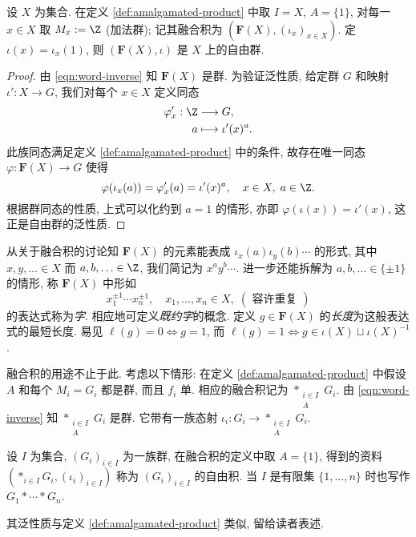 \begin{proposition}
	设 $X$ 为集合. 在定义 \ref{def:amalgamated-product} 中取 $I = X$, $A = \{1\}$, 对每一 $x \in X$ 取 $M_x := \Z$ (加法群); 记其融合积为 $(\mathbf{F}(X), (\iota_x)_{x \in X})$. 定 $\iota(x) = \iota_x(1)$, 则 $(\mathbf{F}(X), \iota)$ 是 $X$ 上的自由群.
\end{proposition}
\begin{proof}
	由 \eqref{eqn:word-inverse} 知 $\mathbf{F}(X)$ 是群. 为验证泛性质, 给定群 $G$ 和映射 $\iota': X \to G$, 我们对每个 $x \in X$ 定义同态
	\begin{align*}
		\varphi'_x: \Z & \longrightarrow G, \\
		a & \longmapsto \iota'(x)^a.
	\end{align*}
	此族同态满足定义 \ref{def:amalgamated-product} 中的条件, 故存在唯一同态 $\varphi: \mathbf{F}(X) \to G$ 使得
	\[ \varphi(\iota_x(a)) = \varphi'_x(a) = \iota'(x)^a, \quad x \in X, \; a \in \Z.  \]
	根据群同态的性质, 上式可以化约到 $a=1$ 的情形, 亦即 $\varphi(\iota(x)) = \iota'(x)$, 这正是自由群的泛性质.
\end{proof}

从关于融合积的讨论知 $\mathbf{F}(X)$ 的元素能表成 $\iota_x(a) \iota_y(b) \cdots$ 的形式, 其中 $x, y, \ldots \in X$ 而 $a, b, \ldots \in \Z$, 我们简记为 $x^a y^b \cdots$. 进一步还能拆解为 $a, b, \ldots \in \{\pm 1\}$ 的情形, 称 $\mathbf{F}(X)$ 中形如
\[ x_1^{\pm 1} \cdots x_n^{\pm 1}, \quad x_1, \ldots, x_n \in X,  \; (\text{ 容许重复 }) \]
的表达式称为\emph{字}. 相应地可定义\emph{既约字}的概念. 定义 $g \in \mathbf{F}(X)$ 的\emph{长度}为这般表达式的最短长度. 易见 $\ell(g)=0 \iff g=1$, 而 $\ell(g)=1 \iff g \in \iota(X) \sqcup \iota(X)^{-1}$.

融合积的用途不止于此. 考虑以下情形: 在定义 \ref{def:amalgamated-product} 中假设 $A$ 和每个 $M_i = G_i$ 都是群, 而且 $f_i$ 单. 相应的融合积记为 $\ast_{\substack{i \in I \\ A}} G_i$. 由 \eqref{eqn:word-inverse} 知 $\ast_{\substack{i \in I \\ A}} G_i$ 是群. 它带有一族态射 $\iota_i: G_i \to \ast_{\substack{i \in I \\ A}} G_i$.

\begin{definition}[自由积]\label{def:free-product}
	设 $I$ 为集合,  $(G_i)_{i \in I}$ 为一族群, 在融合积的定义中取 $A = \{1\}$, 得到的资料 $(\ast_{i \in I} G_i, (\iota_i)_{i \in I})$ 称为 $(G_i)_{i \in I}$ 的自由积. 当 $I$ 是有限集 $\{1, \ldots, n\}$ 时也写作 $G_1 \ast \cdots \ast G_n$.
\end{definition}
其泛性质与定义 \ref{def:amalgamated-product} 类似, 留给读者表述.

